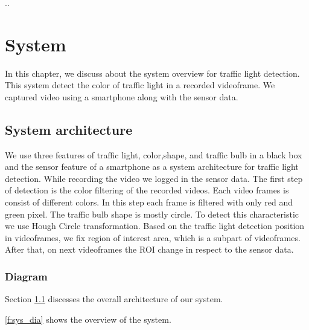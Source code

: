 ..\chapter{System}
In this chapter, we discuss about the system overview for traffic light detection.
This system detect the color of traffic light in a recorded videoframe.
We captured video using a smartphone along with the sensor data.

\section{System architecture}
\label{s:archi}
We use three features of traffic light, color,shape, and traffic bulb in a black box and the sensor feature of a smartphone as a system architecture for traffic light detection.
While recording the video we logged in the sensor data.
The first step of detection is the color filtering of the recorded videos.
Each video frames is consist of different colors.
In this step each frame is filtered with only red and green pixel.
The traffic bulb shape is mostly circle.
To detect this characteristic we use Hough Circle  transformation\cite{hough_circle}.
Based on the traffic light detection position in videoframes, we fix region of interest area, which is a subpart of videoframes.
After that, on next videoframes the ROI change in respect to the sensor data. 

\subsection{Diagram}

Section \ref{s:archi} discesses the overall architecture of our system.

\ref{f:sys_dia} shows the overview of the system.


